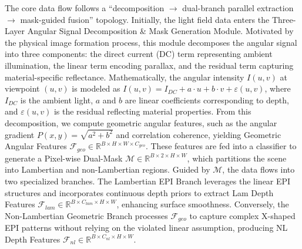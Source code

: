 \documentclass[lettersize,journal]{IEEEtran}
\begin{document}
The core data flow follows a ``decomposition $\rightarrow$ dual-branch parallel extraction $\rightarrow$ mask-guided fusion'' topology. Initially, the light field data enters the Three-Layer Angular Signal Decomposition \& Mask Generation Module. Motivated by the physical image formation process, this module decomposes the angular signal into three components: the direct current (DC) term representing ambient illumination, the linear term encoding parallax, and the residual term capturing material-specific reflectance. Mathematically, the angular intensity $I(u,v)$ at viewpoint $(u,v)$ is modeled as $I(u,v) = I_{DC} + a \cdot u + b \cdot v + \varepsilon(u,v)$, where $I_{DC}$ is the ambient light, $a$ and $b$ are linear coefficients corresponding to depth, and $\varepsilon(u,v)$ is the residual reflecting material properties. From this decomposition, we compute geometric angular features, such as the angular gradient $P(x,y) = \sqrt{a^2+b^2}$ and correlation coherence, yielding Geometric Angular Features $\mathcal{F}_{geo} \in \mathbb{R}^{B \times H \times W \times C_{geo}}$. These features are fed into a classifier to generate a Pixel-wise Dual-Mask $\mathcal{M} \in \mathbb{R}^{B \times 2 \times H \times W}$, which partitions the scene into Lambertian and non-Lambertian regions. Guided by $\mathcal{M}$, the data flows into two specialized branches. The Lambertian EPI Branch leverages the linear EPI structures and incorporates continuous depth priors to extract Lam Depth Features $\mathcal{F}_{lam} \in \mathbb{R}^{B \times C_{lam} \times H \times W}$, enhancing surface smoothness. Conversely, the Non-Lambertian Geometric Branch processes $\mathcal{F}_{geo}$ to capture complex X-shaped EPI patterns without relying on the violated linear assumption, producing NL Depth Features $\mathcal{F}_{nl} \in \mathbb{R}^{B \times C_{nl} \times H \times W}$.
\end{document}
